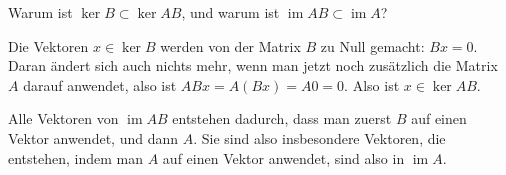 Warum ist $\operatorname{ker}B \subset \operatorname{ker}AB$, und
warum ist $\operatorname{im}AB\subset\operatorname{im}A$?


\begin{loesung}
Die Vektoren $x\in\operatorname{ker}B$ werden von der Matrix $B$ zu
Null gemacht: $Bx=0$. Daran ändert sich auch nichts mehr, wenn man jetzt
noch zusätzlich die Matrix $A$ darauf anwendet, also ist $ABx=A(Bx)=A0=0$.
Also ist $x\in\operatorname{ker}AB$.

Alle Vektoren von $\operatorname{im}AB$ entstehen dadurch, dass
man zuerst $B$ auf einen Vektor anwendet, und dann $A$. Sie sind
also insbesondere Vektoren, die entstehen, indem man $A$ auf einen
Vektor anwendet, sind also in $\operatorname{im}A$.
\end{loesung}

